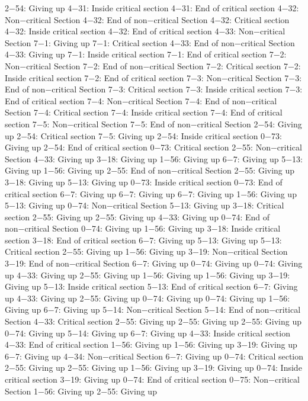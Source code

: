 2−54: Giving up
4−31: Inside critical section
4−31: End of critical section
4−32: Non−critical Section
4−32: End of non−critical Section
4−32: Critical section
4−32: Inside critical section
4−32: End of critical section
4−33: Non−critical Section
7−1: Giving up
7−1: Critical section
4−33: End of non−critical Section
4−33: Giving up
7−1: Inside critical section
7−1: End of critical section
7−2: Non−critical Section
7−2: End of non−critical Section
7−2: Critical section
7−2: Inside critical section
7−2: End of critical section
7−3: Non−critical Section
7−3: End of non−critical Section
7−3: Critical section
7−3: Inside critical section
7−3: End of critical section
7−4: Non−critical Section
7−4: End of non−critical Section
7−4: Critical section
7−4: Inside critical section
7−4: End of critical section
7−5: Non−critical Section
7−5: End of non−critical Section
2−54: Giving up
2−54: Critical section
7−5: Giving up
2−54: Inside critical section
0−73: Giving up
2−54: End of critical section
0−73: Critical section
2−55: Non−critical Section
4−33: Giving up
3−18: Giving up
1−56: Giving up
6−7: Giving up
5−13: Giving up
1−56: Giving up
2−55: End of non−critical Section
2−55: Giving up
3−18: Giving up
5−13: Giving up
0−73: Inside critical section
0−73: End of critical section
6−7: Giving up
6−7: Giving up
6−7: Giving up
1−56: Giving up
5−13: Giving up
0−74: Non−critical Section
5−13: Giving up
3−18: Critical section
2−55: Giving up
2−55: Giving up
4−33: Giving up
0−74: End of non−critical Section
0−74: Giving up
1−56: Giving up
3−18: Inside critical section
3−18: End of critical section
6−7: Giving up
5−13: Giving up
5−13: Critical section
2−55: Giving up
1−56: Giving up
3−19: Non−critical Section
3−19: End of non−critical Section
6−7: Giving up
0−74: Giving up
0−74: Giving up
4−33: Giving up
2−55: Giving up
1−56: Giving up
1−56: Giving up
3−19: Giving up
5−13: Inside critical section
5−13: End of critical section
6−7: Giving up
4−33: Giving up
2−55: Giving up
0−74: Giving up
0−74: Giving up
1−56: Giving up
6−7: Giving up
5−14: Non−critical Section
5−14: End of non−critical Section
4−33: Critical section
2−55: Giving up
2−55: Giving up
2−55: Giving up
0−74: Giving up
5−14: Giving up
6−7: Giving up
4−33: Inside critical section
4−33: End of critical section
1−56: Giving up
1−56: Giving up
3−19: Giving up
6−7: Giving up
4−34: Non−critical Section
6−7: Giving up
0−74: Critical section
2−55: Giving up
2−55: Giving up
1−56: Giving up
3−19: Giving up
0−74: Inside critical section
3−19: Giving up
0−74: End of critical section
0−75: Non−critical Section
1−56: Giving up
2−55: Giving up

